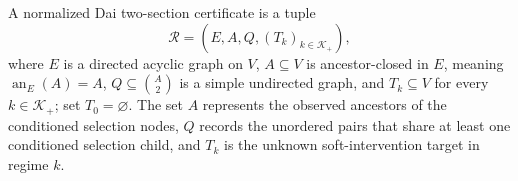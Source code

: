 A normalized Dai two-section certificate is a tuple
\[
\mathcal R=(E,A,Q,(T_k)_{k\in\mathcal K_+}),
\]
where \(E\) is a directed acyclic graph on \(V\), \(A\subseteq V\) is ancestor-closed in \(E\), meaning \(\operatorname{an}_E(A)=A\), \(Q\subseteq\binom{A}{2}\) is a simple undirected graph, and \(T_k\subseteq V\) for every \(k\in\mathcal K_+\); set \(T_0=\varnothing\).  The set \(A\) represents the observed ancestors of the conditioned selection nodes, \(Q\) records the unordered pairs that share at least one conditioned selection child, and \(T_k\) is the unknown soft-intervention target in regime \(k\).